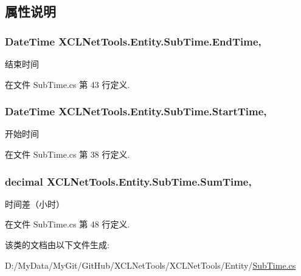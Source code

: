 \subsection{属性说明}
\hypertarget{class_x_c_l_net_tools_1_1_entity_1_1_sub_time_a286d907d4beb9e6153f1abdb6f2c95fd}{
\subsubsection[{End\-Time}]{\setlength{\rightskip}{0pt plus 5cm}Date\-Time X\-C\-L\-Net\-Tools.\-Entity.\-Sub\-Time.\-End\-Time\hspace{0.3cm}{\ttfamily [get]}, {\ttfamily [set]}}}\label{class_x_c_l_net_tools_1_1_entity_1_1_sub_time_a286d907d4beb9e6153f1abdb6f2c95fd}


结束时间 



在文件 Sub\-Time.\-cs 第 43 行定义.

\hypertarget{class_x_c_l_net_tools_1_1_entity_1_1_sub_time_a7813c7a0874535abbe0b5307d7310c27}{
\subsubsection[{Start\-Time}]{\setlength{\rightskip}{0pt plus 5cm}Date\-Time X\-C\-L\-Net\-Tools.\-Entity.\-Sub\-Time.\-Start\-Time\hspace{0.3cm}{\ttfamily [get]}, {\ttfamily [set]}}}\label{class_x_c_l_net_tools_1_1_entity_1_1_sub_time_a7813c7a0874535abbe0b5307d7310c27}


开始时间 



在文件 Sub\-Time.\-cs 第 38 行定义.

\hypertarget{class_x_c_l_net_tools_1_1_entity_1_1_sub_time_afe5aa74e0038c4b4342be84211c3f607}{
\subsubsection[{Sum\-Time}]{\setlength{\rightskip}{0pt plus 5cm}decimal X\-C\-L\-Net\-Tools.\-Entity.\-Sub\-Time.\-Sum\-Time\hspace{0.3cm}{\ttfamily [get]}, {\ttfamily [set]}}}\label{class_x_c_l_net_tools_1_1_entity_1_1_sub_time_afe5aa74e0038c4b4342be84211c3f607}


时间差（小时） 



在文件 Sub\-Time.\-cs 第 48 行定义.



该类的文档由以下文件生成\-:\begin{DoxyCompactItemize}
\item 
D\-:/\-My\-Data/\-My\-Git/\-Git\-Hub/\-X\-C\-L\-Net\-Tools/\-X\-C\-L\-Net\-Tools/\-Entity/\hyperlink{_sub_time_8cs}{Sub\-Time.\-cs}\end{DoxyCompactItemize}
